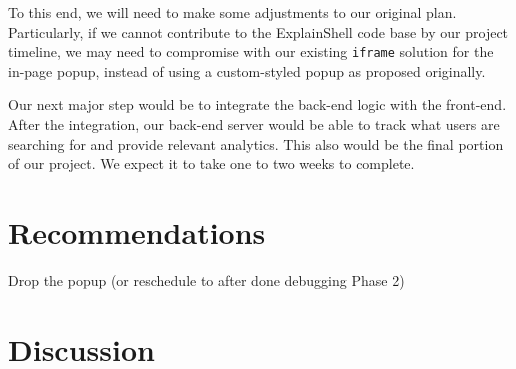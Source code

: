 \documentclass[11pt]{article}
\begin{document}
To this end, we will need to make some adjustments to our original plan. Particularly, if we cannot contribute to the ExplainShell code base by our
project timeline, we may need to compromise with our existing \texttt{iframe}
solution for the in-page popup, instead of using a custom-styled popup as
proposed originally.

Our next major step would be to integrate the back-end logic with the
front-end. After the integration, our back-end server would be able to
track what users are searching for and provide relevant analytics. This also
would be the final portion of our project. We expect it to take one to two
weeks to complete.

\section{Recommendations}

Drop the popup (or reschedule to after done debugging Phase 2)

\section{Discussion}
\end{document}
